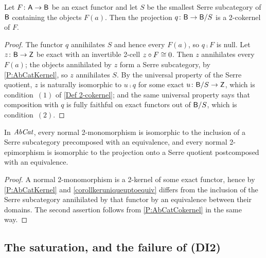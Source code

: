 \begin{proposition}
  \label{P:AbCatCokernel} 
  Let \(F\colon\mathsf{A}\to\mathsf{B}\) be an exact functor and let \(S\) be the smallest Serre subcategory of \(\mathsf{B}\) containing the objects \(F(a)\). Then the projection \(q\colon\mathsf{B}\to\mathsf{B}/S\) is a 2-cokernel of \(F\).
\end{proposition}

\begin{proof}
  The functor \(q\) annihilates \(S\) and hence every \(F(a)\), so \(q\comp F\) is null. Let \(z\colon\mathsf{B}\to\mathsf{Z}\) be exact with an invertible 2-cell \(z\circ F\cong 0\). Then \(z\) annihilates every \(F(a)\); the objects annihilated by \(z\) form a Serre subcategory, by \prox\ref{P:AbCatKernel}, so \(z\) annihilates \(S\). By the universal property of the Serre quotient, \(z\) is naturally isomorphic to \(u\comp q\) for some exact \(u\colon\mathsf{B}/S\to\mathsf{Z}\), which is condition~\((1)\) of \ref{Def 2-cokernel}; and the same universal property says that composition with \(q\) is fully faithful on exact functors out of \(\mathsf{B}/S\), which is condition~\((2)\).
\end{proof}

\begin{corollary}
  \label{C:AbCatNormal} 
  In \(\mathit{AbCat}\), every normal 2-monomorphism is isomorphic to the inclusion of a Serre subcategory precomposed with an equivalence, and every normal 2-epimorphism is isomorphic to the projection onto a Serre quotient postcomposed with an equivalence.
\end{corollary}

\begin{proof}
  A normal 2-monomorphism is a 2-kernel of some exact functor, hence by \prox\ref{P:AbCatKernel} and \corx\ref{corollkeruniqueuptoequiv} differs from the inclusion of the Serre subcategory annihilated by that functor by an equivalence between their domains. The second assertion follows from \prox\ref{P:AbCatCokernel} in the same way.
\end{proof}

\subsection{The saturation, and the failure of \textup{(DI2)}}\label{SS:ModelSaturation}

